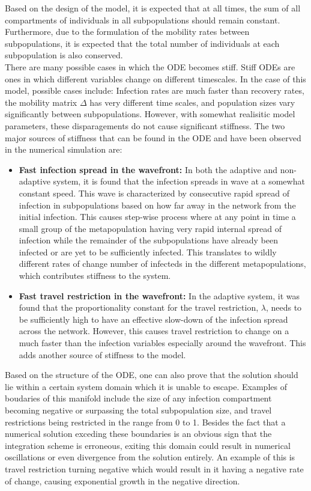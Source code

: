 Based on the design of the model, it is expected that at all times, the sum of all compartments of individuals in all subpopulations should remain constant. Furthermore, due to the formulation of the mobility rates between subpopulations, it is expected that the total number of individuals at each subpopulation is also conserved. \\

There are many possible cases in which the ODE becomes stiff. Stiff ODEs are ones in which different variables change on different timescales. In the case of this model, possible cases include: Infection rates are much faster than recovery rates, the mobility matrix $\Delta$ has very different time scales, and population sizes vary significantly between subpopulations. However, with somewhat realisitic model parameters, these disparagements do not cause significant stiffness. The two major sources of stiffness that can be found in the ODE and have been observed in the numerical simulation are:
\begin{itemize}
	\item \textbf{Fast infection spread in the wavefront:} In both the adaptive and non-adaptive system, it is found that the infection spreads in wave at a somewhat constant speed. This wave is characterized by consecutive rapid spread of infection in subpopulations based on how far away in the network from the initial infection. This causes step-wise process where at any point in time a small group of the metapopulation having very rapid internal spread of infection while the remainder of the subpopulations have already been infected or are yet to be sufficiently infected. This translates to wildly different rates of change number of infecteds in the different metapopulations, which contributes stiffness to the system.
	\item \textbf{Fast travel restriction in the wavefront:} In the adaptive system, it was found that the proportionality constant for the  travel restriction, $\lambda$, needs to be sufficiently high to have an effective slow-down of the infection spread across the network. However, this causes travel restriction to change on a much faster than the infection variables especially around the wavefront. This adds another source of stiffness to the model. 
    
\end{itemize}

Based on the structure of the ODE, one can also prove that the solution should lie within a certain system domain which it is unable to escape. Examples of boudaries of this manifold include the size of any infection compartment becoming negative or surpassing the total subpopulation size, and travel restrictions being restricted in the range from 0 to 1. Besides the fact that a numerical solution exceding these boundaries is an obvious sign that the integration scheme is erroneous, exiting this domain could result in numerical oscillations or even divergence from the solution entirely. An example of this is travel restriction turning negative which would result in it having a negative rate of change, causing exponential growth in the negative direction.\\

